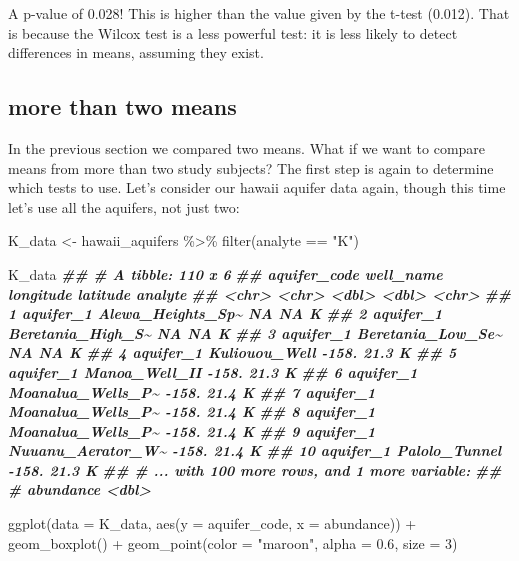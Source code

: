 \documentclass[
]{krantz}
\newenvironment{Shaded}{\begin{snugshade}}{\end{snugshade}}
\newcommand{\AttributeTok}[1]{\textcolor[rgb]{0.77,0.63,0.00}{#1}}
\newcommand{\DecValTok}[1]{\textcolor[rgb]{0.00,0.00,0.81}{#1}}
\newcommand{\DocumentationTok}[1]{\textcolor[rgb]{0.56,0.35,0.01}{\textbf{\textit{#1}}}}
\newcommand{\FloatTok}[1]{\textcolor[rgb]{0.00,0.00,0.81}{#1}}
\newcommand{\FunctionTok}[1]{\textcolor[rgb]{0.00,0.00,0.00}{#1}}
\newcommand{\NormalTok}[1]{#1}
\newcommand{\OtherTok}[1]{\textcolor[rgb]{0.56,0.35,0.01}{#1}}
\newcommand{\SpecialCharTok}[1]{\textcolor[rgb]{0.00,0.00,0.00}{#1}}
\newcommand{\StringTok}[1]{\textcolor[rgb]{0.31,0.60,0.02}{#1}}
\begin{document}
A p-value of 0.028! This is higher than the value given by the t-test (0.012). That is because the Wilcox test is a less powerful test: it is less likely to detect differences in means, assuming they exist.

\hypertarget{more-than-two-means}{%
\subsection{more than two means}\label{more-than-two-means}}

In the previous section we compared two means. What if we want to compare means from more than two study subjects? The first step is again to determine which tests to use. Let's consider our hawaii aquifer data again, though this time let's use all the aquifers, not just two:

\begin{Shaded}
\begin{Highlighting}[]
\NormalTok{K\_data }\OtherTok{\textless{}{-}}\NormalTok{ hawaii\_aquifers }\SpecialCharTok{\%\textgreater{}\%}
  \FunctionTok{filter}\NormalTok{(analyte }\SpecialCharTok{==} \StringTok{"K"}\NormalTok{)}

\NormalTok{K\_data}
\DocumentationTok{\#\# \# A tibble: 110 x 6}
\DocumentationTok{\#\#    aquifer\_code well\_name         longitude latitude analyte}
\DocumentationTok{\#\#    \textless{}chr\textgreater{}        \textless{}chr\textgreater{}                 \textless{}dbl\textgreater{}    \textless{}dbl\textgreater{} \textless{}chr\textgreater{}  }
\DocumentationTok{\#\#  1 aquifer\_1    Alewa\_Heights\_Sp\textasciitilde{}       NA      NA   K      }
\DocumentationTok{\#\#  2 aquifer\_1    Beretania\_High\_S\textasciitilde{}       NA      NA   K      }
\DocumentationTok{\#\#  3 aquifer\_1    Beretania\_Low\_Se\textasciitilde{}       NA      NA   K      }
\DocumentationTok{\#\#  4 aquifer\_1    Kuliouou\_Well         {-}158.     21.3 K      }
\DocumentationTok{\#\#  5 aquifer\_1    Manoa\_Well\_II         {-}158.     21.3 K      }
\DocumentationTok{\#\#  6 aquifer\_1    Moanalua\_Wells\_P\textasciitilde{}     {-}158.     21.4 K      }
\DocumentationTok{\#\#  7 aquifer\_1    Moanalua\_Wells\_P\textasciitilde{}     {-}158.     21.4 K      }
\DocumentationTok{\#\#  8 aquifer\_1    Moanalua\_Wells\_P\textasciitilde{}     {-}158.     21.4 K      }
\DocumentationTok{\#\#  9 aquifer\_1    Nuuanu\_Aerator\_W\textasciitilde{}     {-}158.     21.4 K      }
\DocumentationTok{\#\# 10 aquifer\_1    Palolo\_Tunnel         {-}158.     21.3 K      }
\DocumentationTok{\#\# \# ... with 100 more rows, and 1 more variable:}
\DocumentationTok{\#\# \#   abundance \textless{}dbl\textgreater{}}

\FunctionTok{ggplot}\NormalTok{(}\AttributeTok{data =}\NormalTok{ K\_data, }\FunctionTok{aes}\NormalTok{(}\AttributeTok{y =}\NormalTok{ aquifer\_code, }\AttributeTok{x =}\NormalTok{ abundance)) }\SpecialCharTok{+}
  \FunctionTok{geom\_boxplot}\NormalTok{() }\SpecialCharTok{+}
  \FunctionTok{geom\_point}\NormalTok{(}\AttributeTok{color =} \StringTok{"maroon"}\NormalTok{, }\AttributeTok{alpha =} \FloatTok{0.6}\NormalTok{, }\AttributeTok{size =} \DecValTok{3}\NormalTok{)}
\end{Highlighting}
\end{Shaded}
\end{document}
